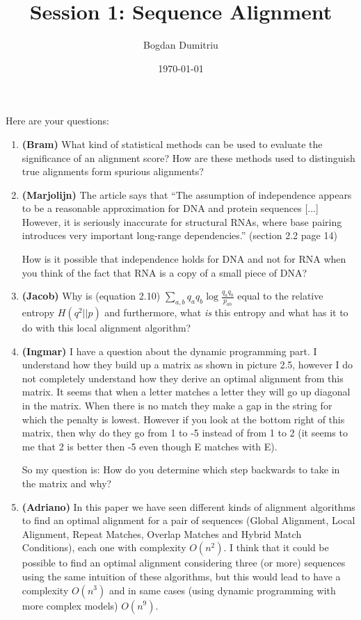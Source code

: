 \documentclass{article}
\title{Session 1: Sequence Alignment}
\author{Bogdan Dumitriu}
\date{\today}
\begin{document}
\maketitle

Here are your questions:

\begin{enumerate}

\item {\bf (Bram)} What kind of statistical methods can be used
to evaluate the significance of an alignment score? How are these
methods used to distinguish true alignments form spurious alignments?

\item {\bf (Marjolijn)} The article says that ``The assumption of
independence appears to be a reasonable approximation for DNA and
protein sequences [...] However, it is seriously inaccurate for
structural RNAs, where base pairing introduces very important
long-range dependencies.'' (section 2.2 page 14)

How is it possible that independence holds for DNA and not for RNA
when you think of the fact that RNA is a copy of a small piece of DNA?

\item {\bf (Jacob)} Why is (equation 2.10) $\displaystyle \sum_{a,b}q_a q_b \log \frac{q_a q_b}{p_{ab}}$
equal to the relative entropy $H(q^2 || p)$ and furthermore,
what \emph{is} this entropy and what has it to do with this local
alignment algorithm?

\item {\bf (Ingmar)} I have a question about the dynamic programming
part. I understand how they build up a matrix as shown in picture 2.5,
however I do not completely understand how they derive an optimal
alignment from this matrix. It seems that when a letter matches a
letter they will go up diagonal in the matrix. When there is no
match they make a gap in the string for which the penalty is lowest.
However if you look at the bottom right of this matrix, then why do
they go from 1 to -5 instead of from 1 to 2 (it seems to me that 2
is better then -5 even though E matches with E).

So my question is: How do you determine which step backwards to take
in the matrix and why?

\item {\bf (Adriano)} In this paper we have seen different kinds of
alignment algorithms to find an optimal alignment for a pair of
sequences (Global Alignment, Local Alignment, Repeat Matches, Overlap
Matches and Hybrid Match Conditions), each one with complexity $O(n^2)$.
I think that it could be possible to find an optimal alignment
considering three (or more) sequences using the same intuition of
these algorithms, but this would lead to have a complexity $O(n^3)$
and in same cases (using dynamic programming with more complex models)
$O(n^9)$.


\end{enumerate}
\end{document}
